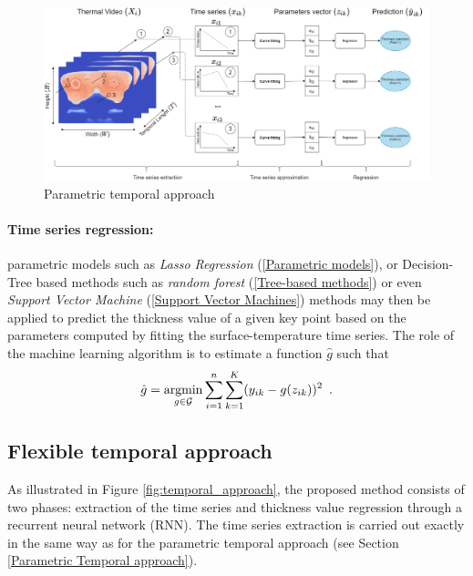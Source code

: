 \begin{figure}
\centering
\includegraphics[scale=0.4]{images/chapter_4/Parametric_Temporal.png}
\caption{Parametric temporal approach}
\label{fig:parametric_temporal_approach}
\end{figure}

\paragraph{Time series regression:}
parametric models such as \textit{Lasso Regression} (\ref{Parametric models}), or Decision-Tree based methods such as \textit{random forest} (\ref{Tree-based methods}) or even \textit{Support Vector Machine} (\ref{Support Vector Machines}) methods may then be applied to predict the thickness value of a given key point based on the parameters computed by fitting the surface-temperature time series. 
The role of the machine learning algorithm is to estimate a function $\hat{g}$ such that
\begin{equation}
    \hat{g} = \operatorname*{argmin}_{g \in \mathcal{G}} \sum_{i=1}^n \sum_{k=1}^K (y_{ik} - g(z_{ik}))^2 \enspace.
\end{equation}


\subsection{Flexible temporal approach}

As illustrated in Figure \ref{fig:temporal_approach}, the proposed method consists of two phases: extraction of the time series and thickness value regression through a recurrent neural network (RNN). The time series extraction is carried out exactly in the same way as for the parametric temporal approach (see Section \ref{Parametric Temporal approach}).  

